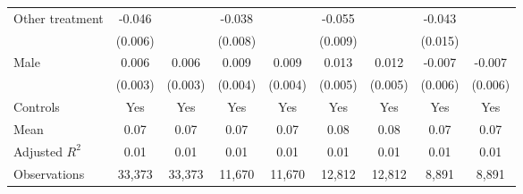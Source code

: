 {\begin{tabular}{l*{8}{c}}
Other treatment     &      -0.046\sym{***}&                     &      -0.038\sym{***}&                     &      -0.055\sym{***}&                     &      -0.043\sym{***}&                     \\
                    &     (0.006)         &                     &     (0.008)         &                     &     (0.009)         &                     &     (0.015)         &                     \\
Male                &       0.006\sym{**} &       0.006\sym{**} &       0.009\sym{**} &       0.009\sym{**} &       0.013\sym{***}&       0.012\sym{***}&      -0.007         &      -0.007         \\
                    &     (0.003)         &     (0.003)         &     (0.004)         &     (0.004)         &     (0.005)         &     (0.005)         &     (0.006)         &     (0.006)         \\
Controls            &         Yes         &         Yes         &         Yes         &         Yes         &         Yes         &         Yes         &         Yes         &         Yes         \\
\hline
Mean                &        0.07         &        0.07         &        0.07         &        0.07         &        0.08         &        0.08         &        0.07         &        0.07         \\
Adjusted \(R^{2}\)  &        0.01         &        0.01         &        0.01         &        0.01         &        0.01         &        0.01         &        0.01         &        0.01         \\
Observations        &      33,373         &      33,373         &      11,670         &      11,670         &      12,812         &      12,812         &       8,891         &       8,891         \\
\hline\hline
\end{tabular}
}
